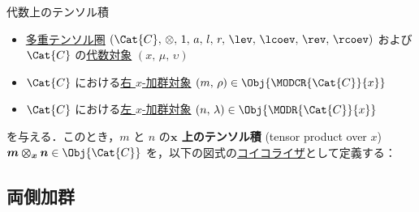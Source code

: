 \documentclass[TQFT_main]{subfiles}
\begin{document}
\begin{mydef}[label=def:tensor-overalg]{代数上のテンソル積}
    \begin{itemize}
        \item \hyperref[def:tensorfusion-cat]{多重テンソル圏} $(\Cat{C},\, \otimes,\, 1,\, a,\, l,\, r,\, \lev,\, \lcoev,\, \rev,\, \rcoev)$ および $\Cat{C}$ の\hyperref[def:algobj]{代数対象} $(x,\, \mu,\, \upsilon)$
        \item $\Cat{C}$ における\hyperref[def:moduleobj]{右 $x$-加群対象} $(m,\, \rho) \in \Obj{\MODCR{\Cat{C}}{x}}$
        \item $\Cat{C}$ における\hyperref[def:moduleobj]{左 $x$-加群対象} $(n,\, \lambda) \in \Obj{\MODR{\Cat{C}}{x}}$
    \end{itemize}
    を与える．このとき，$m$ と $n$ の\textbf{$\bm{x}$ 上のテンソル積} (tensor product over $x$) $\bm{m \otimes_x n} \in \Obj{\Cat{C}}$ を，以下の図式の\hyperref[def:eq-coeq]{コイコライザ}として定義する：
    \begin{center}
    \end{center}
\end{mydef}

\subsection{両側加群}
\end{document}

